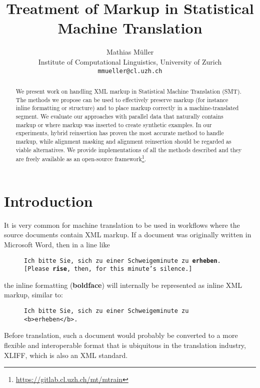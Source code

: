 \documentclass[11pt,letterpaper]{article}
\title{Treatment of Markup in Statistical Machine Translation}
\author{Mathias M\"{u}ller \\
Institute of Computational Linguistics, University of Zurich \\
  {\tt mmueller@cl.uzh.ch}}
\date{}
\begin{document}
\maketitle


\begin{abstract}
  We present work on handling XML markup in Statistical Machine Translation (SMT). The methods we propose can be used to effectively preserve markup (for instance inline formatting or structure) and to place markup correctly in a machine-translated segment. We evaluate our approaches with parallel data that naturally contains markup or where markup was inserted to create synthetic examples. In our experiments, hybrid reinsertion has proven the most accurate method to handle markup, while alignment masking and alignment reinsertion should be regarded as viable alternatives. We provide implementations of all the methods described and they are freely available as an open-source framework\footnote{\url{https://gitlab.cl.uzh.ch/mt/mtrain}}.
\end{abstract}

\section{Introduction}

It is very common for machine translation to be used in workflows where the source documents contain XML markup. If a document was originally written in Microsoft Word, then in a line like

\begin{figure}[h]
\texttt{Ich bitte Sie, sich zu einer Schweigeminute zu \textbf{erheben}.} \\

\texttt{[Please \textbf{rise}, then, for this minute's silence.]}
\end{figure}

\noindent the inline formatting (\textbf{boldface}) will internally be represented as inline XML markup, similar to:

\begin{figure}[h]
\texttt{Ich bitte Sie, sich zu einer Schweigeminute zu <b>erheben</b>.}

\end{figure}


\noindent Before translation, such a document would probably be converted to a more flexible and interoperable format that is ubiquitous in the translation industry, XLIFF, which is also an XML standard.
\end{document}
